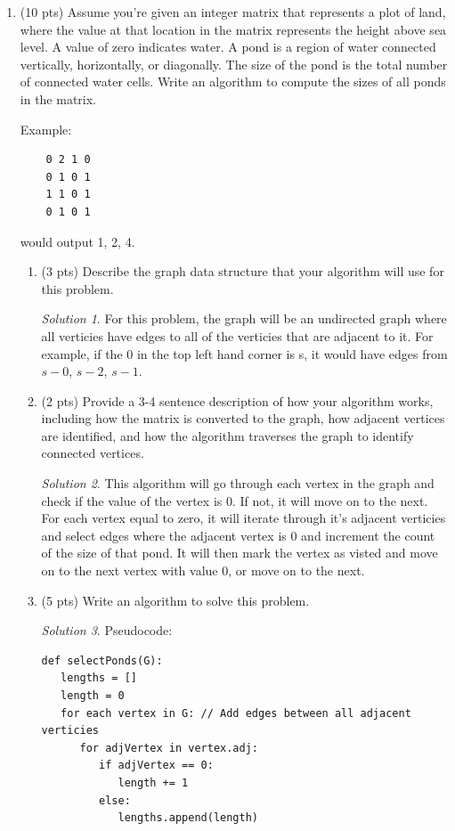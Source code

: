 \documentclass[12pt]{article}
\theoremstyle{remark}
\newtheorem*{solution}{Solution}
\begin{document}
\begin{enumerate}
\item (10 pts) Assume you're given an integer matrix that represents a plot of land, where the value at that location in the matrix represents the height above sea level. A value of zero indicates water. A pond is a region of water connected vertically, horizontally, or diagonally. The size of the pond is the total number of connected water cells. Write an algorithm to compute the sizes of all ponds in the matrix.

Example:
\begin{verbatim}
    0 2 1 0
    0 1 0 1
    1 1 0 1
    0 1 0 1
\end{verbatim}

would output 1, 2, 4.
\begin{enumerate}
    \item (3 pts) Describe the graph data structure that your algorithm will use for this problem.
    
    \begin{solution}
For this problem, the graph will be an undirected graph where all verticies have edges to all of the verticies that are adjacent to it. For example, if the 0 in the top left hand corner is s, it would have edges from $s-0$, $s-2$, $s-1$. 
    \end{solution}
\pagebreak
    
    \item (2 pts) Provide a 3-4 sentence description of how your algorithm works, including how the matrix is converted to the graph, how adjacent vertices are identified, and how the algorithm traverses the graph to identify connected vertices.
    
    \begin{solution}
This algorithm will go through each vertex in the graph and check if the value of the vertex is 0. If not, it will move on to the next. For each vertex equal to zero, it will iterate through it's adjacent verticies and select edges where the adjacent vertex is 0 and increment the count of the size of that pond. It will then mark the vertex as visted and move on to the next vertex with value 0, or move on to the next.
    \end{solution}
    
    \item (5 pts) Write an algorithm to solve this problem. 
    
    \begin{solution}Pseudocode:
\begin{verbatim} 
def selectPonds(G):
   lengths = []
   length = 0
   for each vertex in G: // Add edges between all adjacent verticies
      for adjVertex in vertex.adj:
         if adjVertex == 0:
            length += 1
         else:
            lengths.append(length)
   
         
   
\end{verbatim}
    \end{solution}
    
\end{enumerate}


\end{enumerate}
\end{document}
